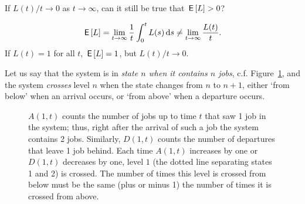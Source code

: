 \begin{exercise}
  If $L(t)/t \to 0$ as $t\to\infty$, can it still be true that $\,\mathsf{E}\left[L\right]>0$? 
  \begin{solution}
    \begin{equation*}
      \,\mathsf{E}\left[L\right] = \lim_{t\to\infty} \frac 1 t \int_0^t L(s) \,\text{d}s \neq \lim_{t\to\infty} \frac{L(t)}t.
    \end{equation*}
If $L(t)=1$ for all $t$, $\,\mathsf{E}\left[L\right] =1 $, but $L(t)/t \to 0$. 
  \end{solution}
\end{exercise}


Let us say that the system is in \emph{state $n$ when it contains $n$
  jobs}, c.f. Figure~\ref{fig:A_n_t}, and the system \emph{crosses}
level $n$ when the state changes from $n$ to $n+1$, either `from
below' when an arrival occurs, or `from above' when a departure
occurs.  


\begin{figure}[th]
  \centering
{}
\caption{ $A(1,t)$ counts the number of jobs up to time $t$ that saw 1
  job in the system; thus, right after the arrival of such a job the
  system contains 2 jobs. Similarly, $D(1,t)$ counts the number of
  departures that leave 1 job behind.  Each time $A(1,t)$ increases by
  one or $D(1,t)$ decreases by one, level $1$ (the dotted line
  separating states 1 and 2) is crossed.  The number of times this
  level is crossed from below must be the same (plus or minus 1) the
  number of times it is crossed from above. }
\label{fig:A_n_t}
\end{figure}



